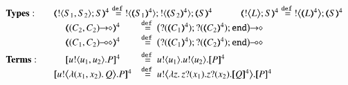 \begin{figure}[t]
\small
\[
\begin{array}{lcl}
{\bf Types:} \quad& 	\multicolumn{2}{c}{
		\tmap{\btout{S_1, S_2}S}{4} \defeq \btout{\tmap{S_1}{4}}  \btout{\tmap{S_2}{4}}\tmap{S}{4}
		\qquad \quad 
		\tmap{\bbtout{L} S}{4} \defeq \bbtout{\mapt{L}^{4}}\mapt{S}^{4}
	}
	\\
	 & \tmap{\shot{(C_2,  C_2)}}{4} &\defeq \shot{\big(\btinp{\tmap{C_1}{4}} \btinp{\tmap{C_2}{4}}\tinact\big)}
	\\
	 & \tmap{\lhot{(C_1,  C_2)}}{4} &\defeq \lhot{\big(\btinp{\tmap{C_1}{4}}  \btinp{\tmap{C_2}{4}}\tinact\big)}
	\\[1mm]
{\bf Terms:} & 
	\map{\bout{u}{u_1, u_2} P}^{4} &\defeq \bout{u}{u_1} \bout{u}{u_2} \map{P}^{4}
	\\
	& \map{\bbout{u}{\abs{(x_1, x_2)} Q} P}^{4} &\defeq \bbout{u}{\abs{z}\binp{z}{x_1} \binp{z}{x_2} \map{Q}^{4}} \map{P}^{4}
	\\


\end{array}\]
\end{figure}
